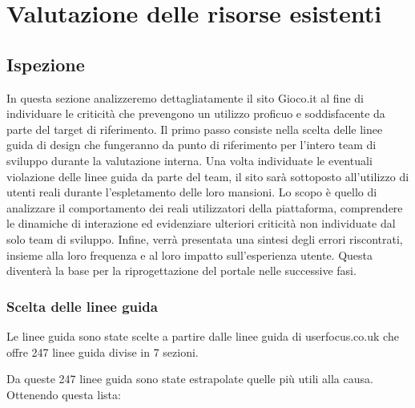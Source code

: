 \documentclass[../Report.tex]{subfiles}
\begin{document}
    \chapter{Valutazione delle risorse esistenti}
    \section{Ispezione}
    In questa sezione analizzeremo dettagliatamente il sito Gioco.it al fine di individuare le criticità che prevengono un utilizzo proficuo e soddisfacente da parte del target di riferimento. Il primo passo consiste nella scelta delle linee guida di design che fungeranno da punto di riferimento per l’intero team di sviluppo durante la valutazione interna. Una volta individuate le eventuali violazione delle linee guida da parte del team, il sito sarà sottoposto all’utilizzo di utenti reali durante l’espletamento delle loro mansioni. Lo scopo è quello di analizzare il comportamento dei reali utilizzatori della piattaforma, comprendere le dinamiche di interazione ed evidenziare ulteriori criticità non individuate dal solo team di sviluppo. Infine, verrà presentata una sintesi degli errori riscontrati, insieme alla loro frequenza e al loro impatto sull’esperienza utente. Questa diventerà la base per la riprogettazione del portale nelle successive fasi. 

    \subsection{Scelta delle linee guida}
    Le linee guida sono state scelte a partire dalle linee guida di userfocus.co.uk che offre 247 linee guida divise in 7 sezioni.

    Da queste 247 linee guida sono state estrapolate quelle più utili alla causa. Ottenendo questa lista:
\end{document}
